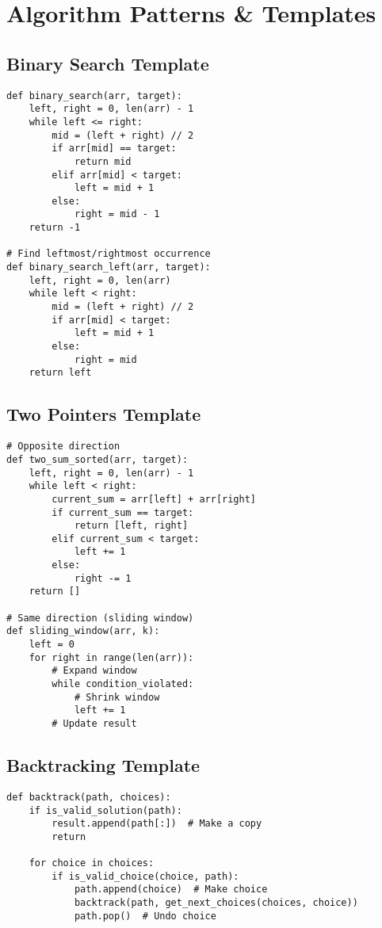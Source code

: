 \section{Algorithm Patterns \& Templates}

\subsection{Binary Search Template}
\begin{verbatim}
def binary_search(arr, target):
    left, right = 0, len(arr) - 1
    while left <= right:
        mid = (left + right) // 2
        if arr[mid] == target:
            return mid
        elif arr[mid] < target:
            left = mid + 1
        else:
            right = mid - 1
    return -1

# Find leftmost/rightmost occurrence
def binary_search_left(arr, target):
    left, right = 0, len(arr)
    while left < right:
        mid = (left + right) // 2
        if arr[mid] < target:
            left = mid + 1
        else:
            right = mid
    return left
\end{verbatim}

\subsection{Two Pointers Template}
\begin{verbatim}
# Opposite direction
def two_sum_sorted(arr, target):
    left, right = 0, len(arr) - 1
    while left < right:
        current_sum = arr[left] + arr[right]
        if current_sum == target:
            return [left, right]
        elif current_sum < target:
            left += 1
        else:
            right -= 1
    return []

# Same direction (sliding window)
def sliding_window(arr, k):
    left = 0
    for right in range(len(arr)):
        # Expand window
        while condition_violated:
            # Shrink window
            left += 1
        # Update result
\end{verbatim}

\subsection{Backtracking Template}
\begin{verbatim}
def backtrack(path, choices):
    if is_valid_solution(path):
        result.append(path[:])  # Make a copy
        return
    
    for choice in choices:
        if is_valid_choice(choice, path):
            path.append(choice)  # Make choice
            backtrack(path, get_next_choices(choices, choice))
            path.pop()  # Undo choice
\end{verbatim}

